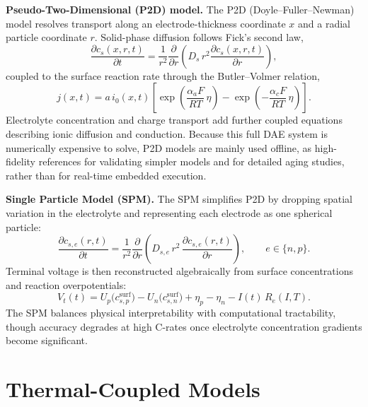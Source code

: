 \textbf{Pseudo-Two-Dimensional (P2D) model.} The P2D (Doyle--Fuller--Newman) model resolves transport along an electrode-thickness coordinate $x$ and a radial particle coordinate $r$. Solid-phase diffusion follows Fick's second law,
\begin{equation}
    \frac{\partial c_s(x,r,t)}{\partial t} = \frac{1}{r^2}\frac{\partial}{\partial r}\left(D_s\, r^2 \frac{\partial c_s(x,r,t)}{\partial r}\right),
    \label{eq:p2d_solid_diffusion}
\end{equation}
coupled to the surface reaction rate through the Butler--Volmer relation,
\begin{equation}
    j(x,t) = a\, i_0(x,t)\left[\exp\!\left(\frac{\alpha_a F}{RT}\,\eta\right) - \exp\!\left(-\frac{\alpha_c F}{RT}\,\eta\right)\right].
    \label{eq:p2d_bv}
\end{equation}
Electrolyte concentration and charge transport add further coupled equations describing ionic diffusion and conduction. Because this full DAE system is numerically expensive to solve, P2D models are mainly used offline, as high-fidelity references for validating simpler models and for detailed aging studies, rather than for real-time embedded execution.

\textbf{Single Particle Model (SPM).} The SPM simplifies P2D by dropping spatial variation in the electrolyte and representing each electrode as one spherical particle:
\begin{equation}
    \frac{\partial c_{s,e}(r,t)}{\partial t} = \frac{1}{r^2}\frac{\partial}{\partial r}\left(D_{s,e}\, r^2\, \frac{\partial c_{s,e}(r,t)}{\partial r}\right), \qquad e \in \{n, p\}.
    \label{eq:spm_diffusion}
\end{equation}
Terminal voltage is then reconstructed algebraically from surface concentrations and reaction overpotentials:
\begin{equation}
    V_t(t) = U_p\big(c_{s,p}^{\text{surf}}\big) - U_n\big(c_{s,n}^{\text{surf}}\big) + \eta_p - \eta_n - I(t)\, R_{e}(I,T).
    \label{eq:spm_terminal}
\end{equation}
The SPM balances physical interpretability with computational tractability, though accuracy degrades at high C-rates once electrolyte concentration gradients become significant.

\section{Thermal-Coupled Models}
\label{sec:thermal}


